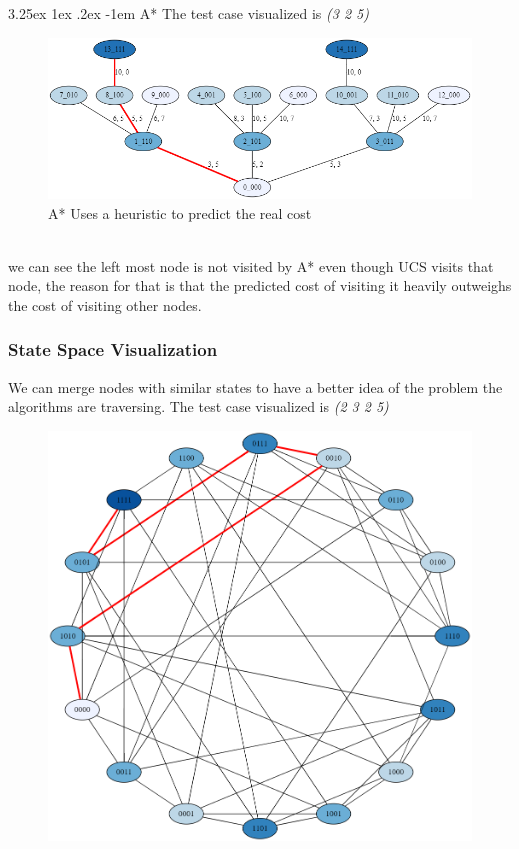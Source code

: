 \documentclass[12pt]{diazessay}
\makeatletter
\renewcommand\paragraph{\@startsection{paragraph}{5}{\z@}%
  {3.25ex \@plus1ex \@minus.2ex}%
  {-1em}%
  {\normalfont\normalsize\bfseries}}
\makeatother
\begin{document}
                \paragraph{A*} The test case visualized is  \textit{(3 2 5)}
                \hskip-4.0cm
                \begin{figure}[h]
                    \centering
                    \includegraphics[width=\textwidth]{Figures/AStar.png}
                    \caption{A* Uses a heuristic to predict the real cost}
                    \label{fig:A*}
                \end{figure}
                \\
                we can see the left most node is not visited by A* even though UCS visits that node, the reason for that is that the predicted cost of visiting it heavily outweighs the cost of visiting other nodes.
                \clearpage
        \subsubsection{State Space Visualization}
            We can merge nodes with similar states to have a better idea of the problem the algorithms are traversing. 
            The test case visualized is  \textit{(2 3 2 5)}
            \hskip-4.0cm
            \begin{figure}[h]
                \centering
                \includegraphics[width=\textwidth]{Figures/State space for k=4.png}
                \label{fig:A*}
            \end{figure}
\end{document}
